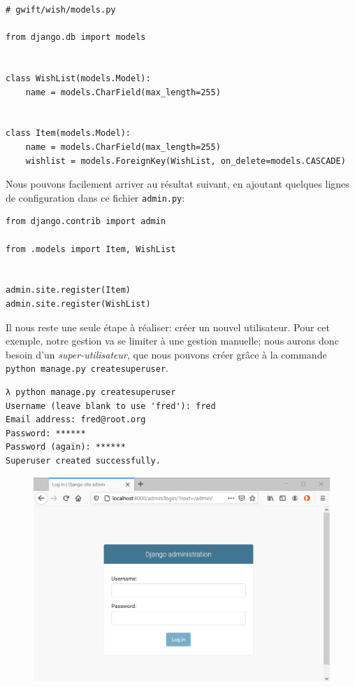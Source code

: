 \documentclass[11pt]{amsbook}
\begin{document}
\begin{verbatim}
# gwift/wish/models.py

from django.db import models


class WishList(models.Model):
    name = models.CharField(max_length=255)


class Item(models.Model):
    name = models.CharField(max_length=255)
    wishlist = models.ForeignKey(WishList, on_delete=models.CASCADE)
\end{verbatim}

Nous pouvons facilement arriver au résultat suivant, en ajoutant quelques lignes de configuration dans ce fichier \texttt{admin.py}:


\begin{verbatim}
from django.contrib import admin

from .models import Item, WishList 


admin.site.register(Item) 
admin.site.register(WishList)
\end{verbatim}


Il nous reste une seule étape à réaliser: créer un nouvel utilisateur.
Pour cet exemple, notre gestion va se limiter à une gestion manuelle; nous aurons donc besoin d’un \emph{super-utilisateur}, que nous pouvons créer grâce à la commande \texttt{python manage.py createsuperuser}.


\begin{verbatim}
λ python manage.py createsuperuser
Username (leave blank to use 'fred'): fred
Email address: fred@root.org
Password: ******
Password (again): ******
Superuser created successfully.
\end{verbatim}

\begin{figure}[h]{}
\centering\includegraphics[width=2.5truein]{images/django/django-site-admin.png}
\caption{}
\centering
\end{figure}
\end{document}
